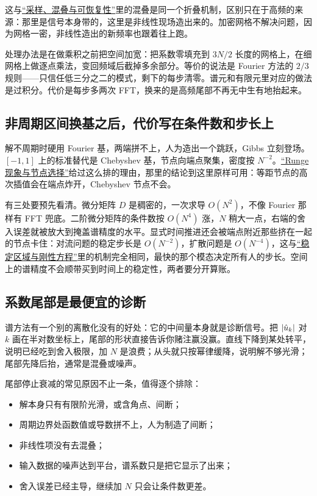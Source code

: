 这与\hyperref[sec:08-Numerical-Analysis/08-Fourier-and-Spectral-Methods/02]{``采样、混叠与可恢复性''}里的混叠是同一个折叠机制，区别只在于高频的来源：那里是信号本身带的，这里是非线性现场造出来的。加密网格不解决问题，因为网格一密，非线性造出的新频率也跟着往上跑。

处理办法是在做乘积之前把空间加宽：把系数零填充到 \(3N/2\) 长度的网格上，在细网格上做逐点乘法，变回频域后截掉多余部分。等价的说法是 Fourier 方法的 \(2/3\) 规则——只信任低三分之二的模式，剩下的每步清零。谱元和有限元里对应的做法是过积分。代价是每步多两次 FFT，换来的是高频尾部不再无中生有地抬起来。

\subsection{非周期区间换基之后，代价写在条件数和步长上}

解不周期时硬用 Fourier 基，两端拼不上，人为造出一个跳跃，Gibbs 立刻登场。\([-1,1]\) 上的标准替代是 Chebyshev 基，节点向端点聚集，密度按 \(N^{-2}\)。\hyperref[sec:08-Numerical-Analysis/03-Interpolation-and-Approximation/02]{``Runge 现象与节点选择''}给过这么排的理由，那里的结论到这里原样可用：等距节点的高次插值会在端点炸开，Chebyshev 节点不会。

有三处要预先看清。微分矩阵 \(D\) 是稠密的，一次求导 \(O(N^2)\)，不像 Fourier 那样有 FFT 兜底。二阶微分矩阵的条件数按 \(O(N^4)\) 涨，\(N\) 稍大一点，右端的舍入误差就被放大到掩盖谱精度的水平。显式时间推进还会被端点附近那些挤在一起的节点卡住：对流问题的稳定步长是 \(O(N^{-2})\)，扩散问题是 \(O(N^{-4})\)，这与\hyperref[sec:08-Numerical-Analysis/06-ODE/03]{``稳定区域与刚性方程''}里的机制完全相同，最快的那个模态决定所有人的步长。空间上的谱精度不会顺带买到时间上的稳定性，两者要分开算账。

\subsection{系数尾部是最便宜的诊断}

谱方法有一个别的离散化没有的好处：它的中间量本身就是诊断信号。把 \(\left|\hat u_k\right|\) 对 \(k\) 画在半对数坐标上，尾部的形状直接告诉你赌注赢没赢。直线下降到某处转平，说明已经吃到舍入极限，加 \(N\) 是浪费；从头就只按幂律缓降，说明解不够光滑；尾部先降后抬，通常是混叠或噪声。

尾部停止衰减的常见原因不止一条，值得逐个排除：

\begin{itemize}
\tightlist
\item
  解本身只有有限阶光滑，或含角点、间断；
\item
  周期边界处函数值或导数拼不上，人为制造了间断；
\item
  非线性项没有去混叠；
\item
  输入数据的噪声达到平台，谱系数只是把它显示了出来；
\item
  舍入误差已经主导，继续加 \(N\) 只会让条件数更差。
\end{itemize}

